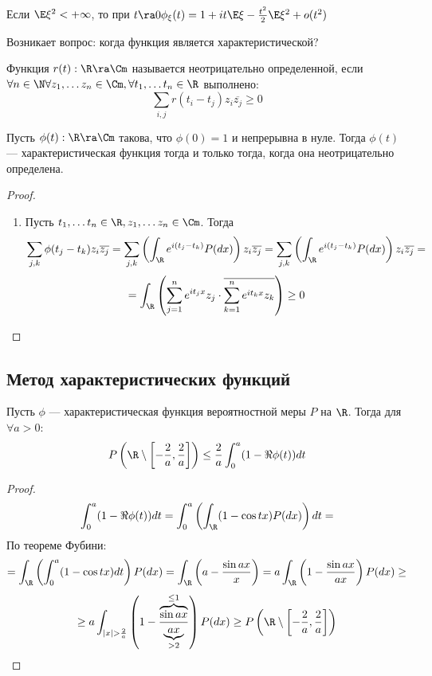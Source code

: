 
\begin{corollary}
    Если \(\E \xi^2 < +\infty\), то при \(t \ra 0 \phi_\xi(t) = 1 + it \E\xi - \frac{t^2}{2}\E\xi^2 + o(t^2)\)
\end{corollary}

Возникает вопрос: когда функция является характеристической?

\begin{definition}
    Функция \(r(t): \R \ra \Cm\) называется неотрицательно определенной, если \(\forall n \in \N \forall z_1, \dots z_n \in \Cm, \forall t_1, \dots t_n \in \R\) выполнено:
    \[\sum_{i, j} r(t_i - t_j)z_i\overline{z_j} \ge 0\]
\end{definition}

\begin{theorem}
    Пусть \(\phi(t): \R \ra \Cm\) такова, что \(\phi(0) = 1\) и непрерывна в нуле. Тогда \(\phi(t)\) --- характеристическая функция тогда и только тогда, когда она неотрицательно определена.
\end{theorem}
\begin{proof}
    \begin{enumerate}
        \item[\(\Ra\)] Пусть \(t_1, \dots t_n \in \R, z_1, \dots z_n \in \Cm\). Тогда 
        \[\sum_{j, k} \phi(t_j - t_k)z_i\overline{z_j} = \sum_{j, k} \left( \int_\R e^{i(t_j - t_k)} P(dx)\right)z_i\overline{z_j} = \sum_{j, k} \left( \int_\R e^{i(t_j - t_k)} P(dx)\right)z_i\overline{z_j} = \]
        \[= \int_\R \left( \sum_{j = 1}^n e^{it_jx}z_j \cdot \overline{\sum_{k = 1}^n e^{it_kx}z_k} \right) \ge 0\]
    \end{enumerate}
\end{proof}

\subsection{Метод характеристических функций}

\begin{lemma}
    Пусть \(\phi\) --- характеристическая функция вероятностной меры \(P\) на \(\R\). Тогда для \(\forall a > 0\):
    \[P\left( \R \setminus \left[ -\frac{2}{a}, \frac{2}{a} \right] \right) \le \frac{2}{a}\int_0^a(1 - \Re \phi(t))dt\]
\end{lemma}
\begin{proof}
    \[\int_0^a(1 - \Re \phi(t))dt = \int_0^a\left( \int_\R (1 - \cos tx)P(dx) \right)dt = \]
    По теореме Фубини:
    \[= \int_\R\left( \int_0^a (1 - \cos tx)dt\right)P(dx) = \int_\R\left( a - \frac{\sin ax}{x} \right) = a\int_\R\left( 1 - \frac{\sin ax}{ax} \right)P(dx) \ge\]
    \[\ge a\int_{|x| > \frac{2}{a}}\left( 1 - \frac{\overbrace{\sin ax}^{\le 1}}{\underbrace{ax}_{> 2}} \right)P(dx) \ge P\left( \R \setminus \left[ -\frac{2}{a}, \frac{2}{a} \right] \right)\]
\end{proof}

